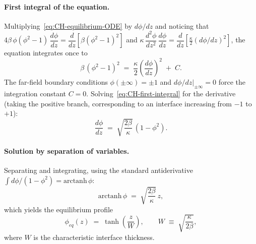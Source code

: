 \paragraph{First integral of the equation.}
Multiplying~\eqref{eq:CH-equilibrium-ODE} by $d\phi/dz$ and noticing that $4\beta\,\phi(\phi^2-1)\,\dfrac{d\phi}{dz} = \dfrac{d}{dz}\!\left[\beta(\phi^2-1)^2\right]$ and $\kappa\,\dfrac{d^2\phi}{dz^2}\,\dfrac{d\phi}{dz} = \dfrac{d}{dz}\!\left[\tfrac{\kappa}{2}(d\phi/dz)^2\right]$, the equation integrates once to
\begin{equation}
\label{eq:CH-first-integral}
\beta\,(\phi^2 - 1)^2 \;=\; \frac{\kappa}{2}\!\left(\frac{d\phi}{dz}\right)^{\!2} \;+\; C.
\end{equation}
The far-field boundary conditions $\phi(\pm\infty) = \pm 1$ and $d\phi/dz|_{\pm\infty} = 0$ force the integration constant $C = 0$.
Solving~\eqref{eq:CH-first-integral} for the derivative (taking the positive branch, corresponding to an interface increasing from $-1$ to $+1$):
\begin{equation}
\frac{d\phi}{dz} \;=\; \sqrt{\frac{2\beta}{\kappa}}\,(1 - \phi^2).
\end{equation}

\paragraph{Solution by separation of variables.}
Separating and integrating, using the standard antiderivative $\int d\phi/(1-\phi^2) = \mathrm{arctanh}\,\phi$:
\begin{equation}
\mathrm{arctanh}\,\phi \;=\; \sqrt{\frac{2\beta}{\kappa}}\,z,
\end{equation}
which yields the equilibrium profile
\begin{equation}
\label{eq:phi-tanh}
\boxed{\;\phi_{eq}(z) \;=\; \tanh\!\left( \frac{z}{W} \right), \qquad W \;\equiv\; \sqrt{\frac{\kappa}{2\beta}},\;}
\end{equation}
where $W$ is the characteristic interface thickness.

